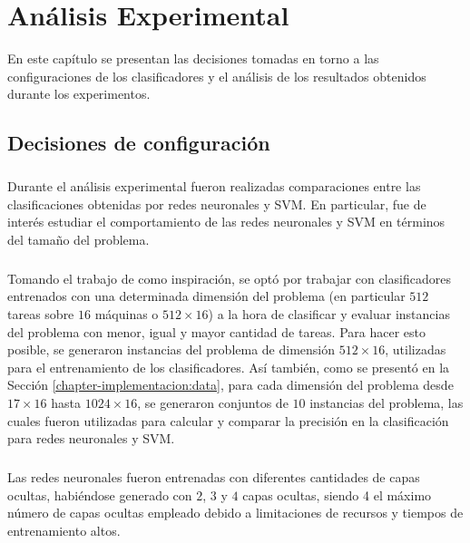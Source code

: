 \chapter{Análisis Experimental} \label{capitulo:analisis-experimental}

En este capítulo se presentan las decisiones tomadas en torno a las configuraciones de los clasificadores y el análisis de los resultados obtenidos durante los experimentos. 

\section{Decisiones de configuración} \label{capitulo:configuracion}

\paragraph{} Durante el análisis experimental fueron realizadas comparaciones entre las clasificaciones obtenidas por redes neuronales y SVM.
En particular, fue de interés estudiar el comportamiento de las redes neuronales y SVM en términos del tamaño del problema.

\paragraph{} Tomando el trabajo de \citet{savant-original} como inspiración, se optó por trabajar con clasificadores entrenados con una determinada dimensión del problema (en particular $512$ tareas sobre $16$ máquinas o $512\times 16$) a la hora de clasificar y evaluar instancias del problema con menor, igual y mayor cantidad de tareas.
Para hacer esto posible, se generaron instancias del problema de dimensión $512\times 16$, utilizadas para el entrenamiento de los clasificadores.
Así también, como se presentó en la Sección \ref{chapter-implementacion:data}, para cada dimensión del problema desde $17\times 16$ hasta $1024\times 16$, se generaron conjuntos de $10$ instancias del problema, las cuales fueron utilizadas para calcular y comparar la precisión en la clasificación para redes neuronales y SVM.

\paragraph{} Las redes neuronales fueron entrenadas con diferentes cantidades de capas ocultas, habiéndose generado con $2$, $3$ y $4$ capas ocultas, siendo 4 el máximo número de capas ocultas empleado debido a limitaciones de recursos y tiempos de entrenamiento altos.


